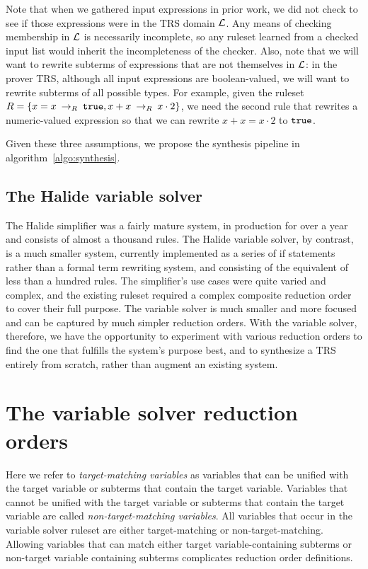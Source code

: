 Note that when we gathered input expressions in prior work, we did not check to see if those expressions were in the TRS domain $\mathcal{L}$. Any means of checking membership in $\mathcal{L}$ is necessarily incomplete, so any ruleset learned from a checked input list would inherit the incompleteness of the checker. Also, note that we will want to rewrite subterms of expressions that are not themselves in $\mathcal{L}$: in the prover TRS, although all input expressions are boolean-valued, we will want to rewrite subterms of all possible types. For example, given the ruleset $R = \{x = x \:\rightarrow_{R}\: \texttt{true}, x + x \:\rightarrow_{R}\: x \cdot 2\}$, we need the second rule that rewrites a numeric-valued expression so that we can rewrite $x + x = x \cdot 2$ to $\texttt{true}$.

Given these three assumptions, we propose the synthesis pipeline in algorithm~\ref{algo:synthesis}. 

\subsection{The Halide variable solver}

The Halide simplifier was a fairly mature system, in production for over a year and consists of almost a thousand rules. The Halide variable solver, by contrast, is a much smaller system, currently implemented as a series of if statements rather than a formal term rewriting system, and consisting of the equivalent of less than a hundred rules. The simplifier's use cases were quite varied and complex, and the existing ruleset required a complex composite reduction order to cover their full purpose. The variable solver is much smaller and more focused and can be captured by much simpler reduction orders. With the variable solver, therefore, we have the opportunity to experiment with various reduction orders to find the one that fulfills the system's purpose best, and to synthesize a TRS entirely from scratch, rather than augment an existing system.


\section{The variable solver reduction orders}

Here we refer to \emph{target-matching variables} as variables that can be unified with the target variable or subterms that contain the target variable. Variables that cannot be unified with the target variable or subterms that contain the target variable are called \emph{non-target-matching variables}. All variables that occur in the variable solver ruleset are either target-matching or non-target-matching. Allowing variables that can match either target variable-containing subterms or non-target variable containing subterms complicates reduction order definitions. 

